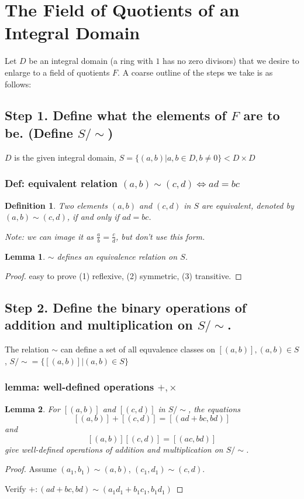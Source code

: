 \documentclass[11pt,a4paper]{article}
\newtheorem{lemma}{Lemma}
\newtheorem{definition}{Definition}
\begin{document}
\section{The Field of Quotients of an Integral Domain}
Let $D$ be an integral domain (a ring with $1$ has no zero divisors) that we desire to enlarge to a field of quotients $F$. A coarse
outline of the steps we take is as follows:

\subsection{Step 1. Define what the elements of $F$ are to be. (Define $S/\sim$)}
$D$ is the given integral domain, $S=\{(a,b)|a,b\in D,b\neq 0\}<D\times D$
\subsubsection{Def: equivalent relation $(a,b)\sim(c,d) \Leftrightarrow	ad = bc$}
\begin{definition}
    Two elements $(a, b)$ and $(c, d)$ in $S$ are equivalent, denoted by $(a, b) \sim (c, d)$, if and only if $ad = bc$.

    Note: we can image it as $\frac{a}{b}=\frac{c}{d}$, but don't use this form.
\end{definition}

\begin{lemma}
    $\sim$ defines an equivalence relation on $S$.
\end{lemma}
\begin{proof}
easy to prove (1) reflexive, (2) symmetric, (3) transitive.
\end{proof}

\subsection{Step 2. Define the binary operations of addition and multiplication on $S/\sim$.}
The relation $\sim$ can define a set of all equvalence classes on $[(a,b)], (a,b)\in S$, $S/\sim=\{[(a,b)]|(a,b)\in S\}$
\subsubsection{lemma: well-defined operations $+,\times$}
\begin{lemma}
    For $[(a, b)]$ and $[(c, d)]$ in $S/\sim$, the equations
    $$
    [(a, b)]+[(c, d)]=[(a d+b c, b d)]
    $$
    and
    $$
    [(a, b)][(c, d)]=[(a c, b d)]
    $$
    give well-defined operations of addition and multiplication on $S/\sim$.
\end{lemma}
\begin{proof}
Assume $(a_1,b_1)\sim(a,b)$, $(c_1,d_1)\sim (c,d)$.

Verify $+:(ad+bc,bd)\sim (a_1d_1+b_1c_1,b_1d_1)$

\end{proof}
\end{document}
